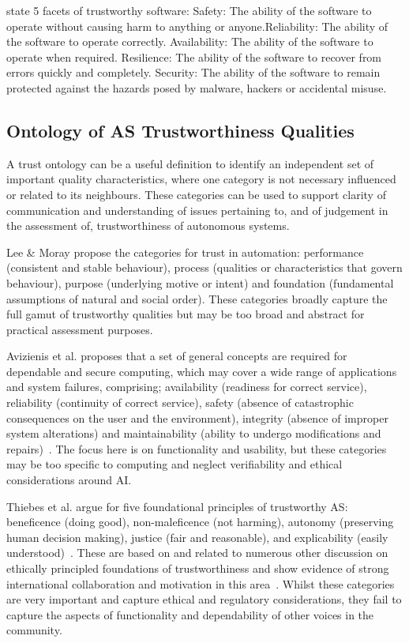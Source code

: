 \cite{ts_foundation} state 5 facets of trustworthy software: Safety: The ability of the software to operate without causing harm to anything or anyone.Reliability: The ability of the software to operate correctly. Availability: The ability of the software to operate when required.
Resilience: The ability of the software to recover from errors quickly and completely. Security: The ability of the software to remain protected against the hazards posed by malware, hackers or accidental misuse.



\subsection{Ontology of AS Trustworthiness Qualities}

A trust ontology can be a useful definition to identify an independent set of important quality characteristics, where one category is not necessary influenced or related to its neighbours. These categories can be used to support clarity of communication and understanding of issues pertaining to, and of judgement in the assessment of, trustworthiness of autonomous systems. 

Lee \& Moray propose the categories for trust in automation: performance (consistent and stable behaviour), process (qualities or characteristics that govern behaviour), purpose (underlying motive or intent) and foundation (fundamental assumptions of natural and social order). These categories broadly capture the full gamut of trustworthy qualities but may be too broad and abstract for practical assessment purposes. 

Avizienis et al. proposes that a set of general concepts are required for dependable and secure computing, which may cover a wide range of applications and system failures, comprising; availability (readiness for correct service), reliability (continuity of correct service), safety (absence of catastrophic consequences on the user and the environment), integrity (absence of improper system alterations) and maintainability (ability to undergo modifications and repairs)~\cite{avizienis2004basic}. The focus here is on functionality and usability, but these categories may be too specific to computing and neglect verifiability and ethical considerations around AI.

Thiebes et al. argue for five foundational principles of trustworthy AS: beneficence (doing good), non-maleficence (not harming), autonomy (preserving human decision making), justice (fair and reasonable), and explicability (easily understood)~\cite{Thiebes2021}. These are based on and related to numerous other discussion on ethically principled foundations of trustworthiness and show evidence of strong international collaboration and motivation in this area~\cite{Floridi2018,jobin2019global}. Whilst these categories are very important and capture ethical and regulatory considerations, they fail to capture the aspects of functionality and dependability of other voices in the community.

